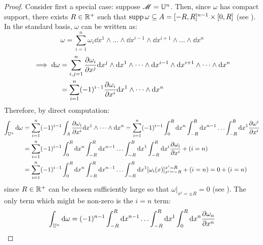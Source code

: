 \begin{proofbox}
  \begin{proof}
    Consider first a special case: suppose $ \mathscr{M} = \mathbb{U}^n $. Then, since $ \omega $ has compact support, there exists $ R \in \mathbb{R}^+ $ such that $ \operatorname{supp} \omega \subseteq A = [-R,R]^{n-1} \times [0,R] $ (see ). In the standard basis, $ \omega $ can be written as:
    \begin{equation*}
      \omega = \sum_{i = 1}^n \omega_i \dd x^1 \wedge \dots \wedge \dd x^{i-1} \wedge \dd x^{i+1} \wedge \dots \wedge \dd x^n
    \end{equation*}
    \begin{equation*}
      \begin{split}
        \implies \mathrm{d} \omega
        & = \sum_{i,j = 1}^n \frac{\partial \omega_i}{\partial x^j} \mathrm{d} x^j \wedge \mathrm{d} x^1 \wedge \dots \wedge \mathrm{d} x^{i-1} \wedge \mathrm{d} x^{i+1} \wedge \dots \wedge \mathrm{d} x^n \\
        & = \sum_{i = 1}^n (-1)^{i-1} \frac{\partial \omega_i}{\partial x^i} \mathrm{d} x^1 \wedge \dots \wedge \mathrm{d} x^n
      \end{split}
    \end{equation*}
    Therefore, by direct computation:
    \begin{equation*}
      \begin{split}
        \int_{\mathbb{U}^n} \mathrm{d} \omega
        & = \sum_{i = 1}^n (-1)^{i-1} \int_A \frac{\partial \omega_i}{\partial x^i} \mathrm{d} x^1 \wedge \dots \wedge \mathrm{d} x^n = \sum_{i = 1}^n (-1)^{i-1} \int_0^R \mathrm{d} x^n \int_{-R}^R \mathrm{d} x^{n-1} \dots \int_{-R}^R \mathrm{d} x^1 \frac{\partial \omega^i}{\partial x^i} \\
        & = \sum_{i = 1}^n (-1)^{i-1} \int_0^R \mathrm{d} x^n \int_{-R}^R \mathrm{d} x^{n-1} \dots \int_{-R}^R \mathrm{d} x^1 \int_{-R}^R \mathrm{d} x^i \frac{\partial \omega_i}{\partial x^i} + (i = n) \\
        & = \sum_{i = 1}^n (-1)^{i-1} \int_0^R \mathrm{d} x^n \int_{-R}^R \mathrm{d} x^{n-1} \dots \int_{-R}^R \mathrm{d} x^1 [\omega_i(x)]_{x^i = -R}^{x^i = R} + (i = n) = 0 + (i = n)
      \end{split}
    \end{equation*}
    since $ R \in \mathbb{R}^+ $ can be chosen sufficiently large so that $ \omega \vert_{x^i = \pm R} = 0 $ (see ). The only term which might be non-zero is the $ i = n $ term:
    \begin{equation*}
      \begin{split}
        \int_{\U^n} \dd \omega
        & = (-1)^{n-1} \int_{-R}^R \dd x^{n-1} \dots \int_{-R}^R \dd x^1 \int_0^R \dd x^n \frac{\pa \omega_n}{\pa x^n} \\

\end{split}
\end{equation*}
\end{proof}
\end{proofbox}
